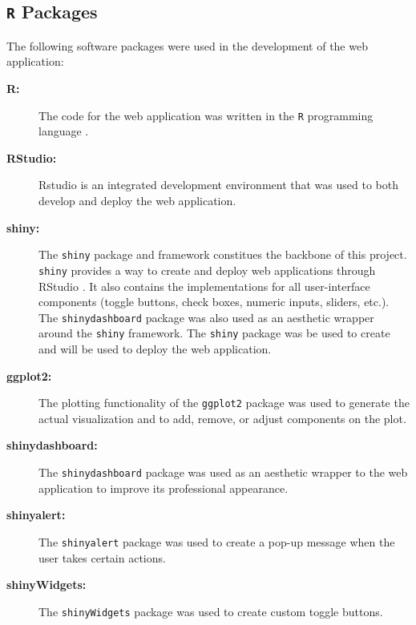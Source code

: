\documentclass[11pt]{asaproc}\usepackage[]{graphicx}\usepackage[]{color}
\begin{document}
\subsection{{\tt R} Packages}
The following software packages were used in the development of the web application:

\begin{description}

\item[{\bf R:}] The code for the web application was written in the {\tt R} programming language \citep{R}.

\item[{\bf RStudio:}] Rstudio \citep{RSTUDIO} is an integrated development environment that was used to both develop and deploy the web application.

\item[{\bf shiny:}] The {\tt shiny} package and framework \citep{SHINY} constitues the backbone of this project. {\tt shiny} provides a way to create and deploy web applications through RStudio \citep{RSTUDIO}. It also contains the implementations for all user-interface components (toggle buttons, check boxes, numeric inputs, sliders, etc.). The {\tt shinydashboard} package \citep{DASH} was also used as an aesthetic wrapper around the {\tt shiny} framework. The {\tt shiny} package was be used to create and will be used to deploy the web application.

\item[{\bf ggplot2:}] The plotting functionality of the {\tt ggplot2} package \citep{GGPLOT} was used to generate the actual visualization and to add, remove, or adjust components on the plot. 

\item[{\bf shinydashboard:}] The {\tt shinydashboard} package \citep{DASH} was used as an aesthetic wrapper to the web application to improve its professional appearance. 

\item[{\bf shinyalert:}] The {\tt shinyalert} package \citep{SALERT} was used to create a pop-up message when the user takes certain actions.

\item[{\bf shinyWidgets:}] The {\tt shinyWidgets} package \citep{SWIDGET} was used to create custom toggle buttons.

\end{description}

\vspace{5mm}
\end{document}
